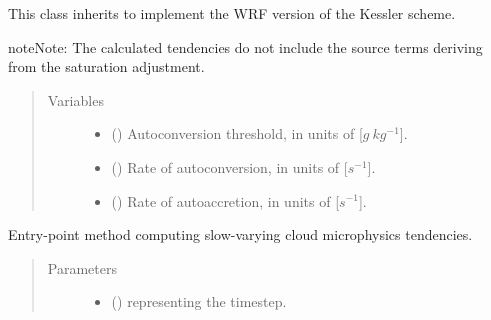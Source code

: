 \documentclass[letterpaper,10pt,english]{sphinxmanual}
\begin{document}

\begin{fulllineitems}
\label{\detokenize{api:tasmania.parameterizations.slow_tendency_microphysics_kessler_wrf.SlowTendencyMicrophysicsKesslerWRF}}
This class inherits {\hyperref[\detokenize{api:tasmania.parameterizations.slow_tendencies.SlowTendencyMicrophysics}]{}}
to implement the WRF version of the Kessler scheme.

\begin{sphinxadmonition}{note}{Note:}
The calculated tendencies do not include the source terms deriving from the saturation adjustment.
\end{sphinxadmonition}
\begin{quote}\begin{description}
\item[{Variables}] \leavevmode\begin{itemize}
\item {} 
 () \textendash{} Autoconversion threshold, in units of {[}\(g ~ kg^{-1}\){]}.

\item {} 
 () \textendash{} Rate of autoconversion, in units of {[}\(s^{-1}\){]}.

\item {} 
 () \textendash{} Rate of autoaccretion, in units of {[}\(s^{-1}\){]}.

\end{itemize}

\end{description}\end{quote}

\begin{fulllineitems}
\label{\detokenize{api:tasmania.parameterizations.slow_tendency_microphysics_kessler_wrf.SlowTendencyMicrophysicsKesslerWRF.__call__}}
Entry-point method computing slow-varying cloud microphysics tendencies.
\begin{quote}\begin{description}
\item[{Parameters}] \leavevmode\begin{itemize}
\item {} 
 () \textendash{}  representing the timestep.


\end{itemize}
\end{description}
\end{quote}
\end{fulllineitems}
\end{fulllineitems}
\end{document}
